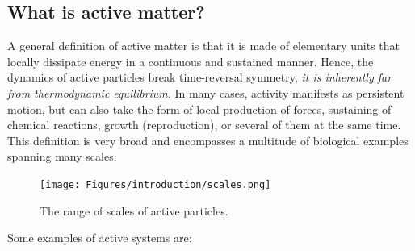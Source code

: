 \label{chapter: introduction}



\subsection*{What is active matter?}


A general definition of active matter is that it is made of elementary units that locally dissipate energy in a continuous and sustained manner. 
Hence, the dynamics of active particles break time-reversal symmetry, \textit{it is inherently far from thermodynamic equilibrium}. 
In many cases, activity manifests as persistent motion, but can also take the form of local production of forces, sustaining of chemical reactions, growth (reproduction), or several of them at the same time. This definition is very broad and encompasses a multitude of biological examples spanning many scales:

\begin{figure}[!htb]
    \centering
    \texttt{[image: Figures/introduction/scales.png]}
    \caption{The range of scales of active particles.}
    \label{fig: scales active particles}
\end{figure}


Some examples of active systems are:

